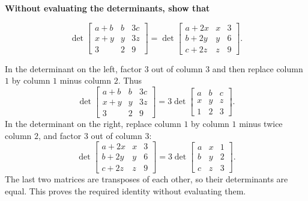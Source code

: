 \providecommand{\rank}{\operatorname{r}}
\providecommand{\RR}{\mathbb R}
\providecommand{\CC}{\mathbb C}
\providecommand{\KK}{\mathbb K}

\setcounter{enumi}{46}
\item {\bfseries\boldmath
Without evaluating the determinants, show that
}

\[
\det\begin{bmatrix}a+b&b&3c\\x+y&y&3z\\3&2&9\end{bmatrix}=\det\begin{bmatrix}a+2x&x&3\\b+2y&y&6\\c+2z&z&9\end{bmatrix}.
\]

\begin{answer}
In the determinant on the left, factor $3$ out of column $3$ and then replace
column $1$ by column $1$ minus column $2$. Thus
\[
 \det\begin{bmatrix}a+b&b&3c\\x+y&y&3z\\3&2&9\end{bmatrix}
 =3\det\begin{bmatrix}a&b&c\\x&y&z\\1&2&3\end{bmatrix}.
\]
In the determinant on the right, replace column $1$ by column $1$ minus twice
column $2$, and factor $3$ out of column $3$:
\[
 \det\begin{bmatrix}a+2x&x&3\\b+2y&y&6\\c+2z&z&9\end{bmatrix}
 =3\det\begin{bmatrix}a&x&1\\b&y&2\\c&z&3\end{bmatrix}.
\]
The last two matrices are transposes of each other, so their determinants are
equal. This proves the required identity without evaluating them.
\end{answer}
